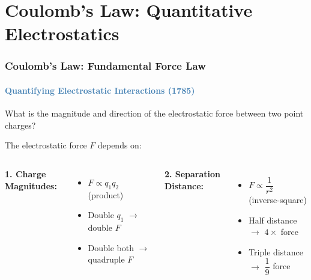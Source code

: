 \section{Coulomb's Law: Quantitative Electrostatics}

\begin{frame}
\frametitle{\textsf{\textbf{Coulomb's Law:} Fundamental Force Law}}
\framesubtitle{\textcolor{steelblue}{Quantifying Electrostatic Interactions (1785)}}

\vspace{-0.05cm}

\begin{keybox}
\vspace{0.05cm}
\centering
\Large What is the magnitude and direction of the electrostatic force between two point charges?
\vspace{0.05cm}
\end{keybox}

\vspace{0.25cm}

\begin{examplebox}
\vspace{0.1cm}
The electrostatic force $F$ depends on:

\vspace{0.15cm}

\begin{columns}[T]
    \textbf{1. Charge Magnitudes:}
    \begin{itemize}
        \item $F \propto q_1 q_2$ (product)
        \item Double $q_1$ $\rightarrow$ double $F$
        \item Double both $\rightarrow$ quadruple $F$
    \end{itemize}
    
    \textbf{2. Separation Distance:}
    \begin{itemize}
        \item $F \propto \dfrac{1}{r^2}$ (inverse-square)
        \item Half distance $\rightarrow$ $4\times$ force
        \item Triple distance $\rightarrow$ $\dfrac{1}{9}$ force
    \end{itemize}
\end{columns}
\end{examplebox}


\end{frame}
